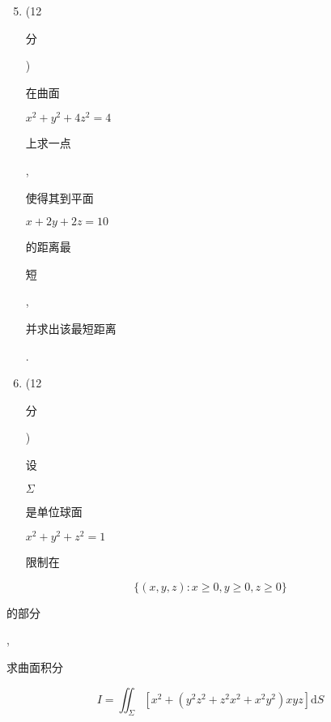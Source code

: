 \documentclass[10pt]{article}
\begin{document}
\begin{enumerate}
  \setcounter{enumi}{4}
  \item (12 \begin{CJK}{UTF8}{mj}分\end{CJK}) \begin{CJK}{UTF8}{mj}在曲面\end{CJK} $x^{2}+y^{2}+4 z^{2}=4$ \begin{CJK}{UTF8}{mj}上求一点\end{CJK}, \begin{CJK}{UTF8}{mj}使得其到平面\end{CJK} $x+2 y+2 z=10$ \begin{CJK}{UTF8}{mj}的距离最\end{CJK} \begin{CJK}{UTF8}{mj}短\end{CJK}, \begin{CJK}{UTF8}{mj}并求出该最短距离\end{CJK}.

  \item (12 \begin{CJK}{UTF8}{mj}分\end{CJK}) \begin{CJK}{UTF8}{mj}设\end{CJK} $\Sigma$ \begin{CJK}{UTF8}{mj}是单位球面\end{CJK} $x^{2}+y^{2}+z^{2}=1$ \begin{CJK}{UTF8}{mj}限制在\end{CJK}

\end{enumerate}
$$
\{(x, y, z): x \geqslant 0, y \geqslant 0, z \geqslant 0\}
$$
\begin{CJK}{UTF8}{mj}的部分\end{CJK}, \begin{CJK}{UTF8}{mj}求曲面积分\end{CJK}
$$
I=\iint_{\Sigma}\left[x^{2}+\left(y^{2} z^{2}+z^{2} x^{2}+x^{2} y^{2}\right) x y z\right] \mathrm{d} S
$$
\end{document}
